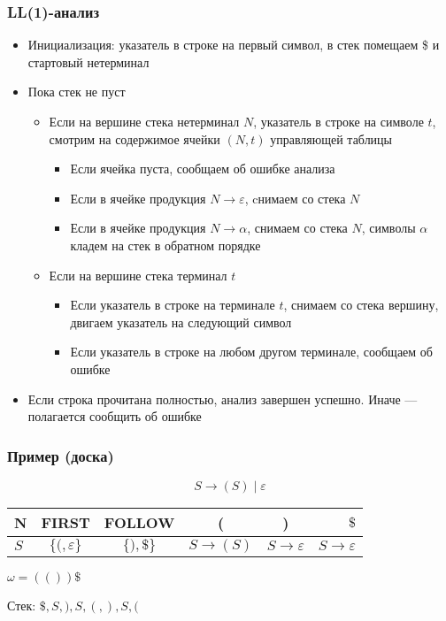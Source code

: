 \documentclass{beamer}
\begin{document}
\begin{frame}[fragile]
  \transwipe[direction=90]
  \frametitle{LL(1)-анализ}
\begin{itemize}
  \item Инициализация: указатель в строке на первый символ, в стек помещаем \$ и стартовый нетерминал
  \item Пока стек не пуст
  \begin{itemize}
    \item Если на вершине стека нетерминал $N$, указатель в строке на символе $t$, смотрим на содержимое ячейки $(N,t)$ управляющей таблицы
    \begin{itemize}
      \item Если ячейка пуста, сообщаем об ошибке анализа
      \item Если в ячейке продукция $N \to \varepsilon$, cнимаем со стека $N$
      \item Если в ячейке продукция $N \to \alpha$, снимаем со стека $N$, символы $\alpha$ кладем на стек в обратном порядке
    \end{itemize}
    \item Если на вершине стека терминал $t$
    \begin{itemize}
      \item Если указатель в строке на терминале $t$, снимаем со стека вершину, двигаем указатель на следующий символ
      \item Если указатель в строке на любом другом терминале, сообщаем об ошибке
    \end{itemize}
  \end{itemize}

  \item Если строка прочитана полностью, анализ завершен успешно.
  Иначе — полагается сообщить об ошибке
\end{itemize}
\end{frame}

\begin{frame}[fragile]
  \transwipe[direction=90]
  \frametitle{Пример (доска)}
  \[
  S \to ( S ) \mid \varepsilon
  \]

\begin{center}
\begin{tabular}{ l || c | c || c | c | r }
  N & FIRST & FOLLOW & ( & ) & $\$ $ \\ \hline
  $S$ & $\{ (, \varepsilon \}$ & $\{ ), \$ \}$ & $S \to (S)$ & $S \to \varepsilon$ & $S \to \varepsilon$
\end{tabular}
\end{center}

$\omega = (()) \$ $

Стек: $\$, S, ), S, (, ), S, ($
\end{frame}
\end{document}
